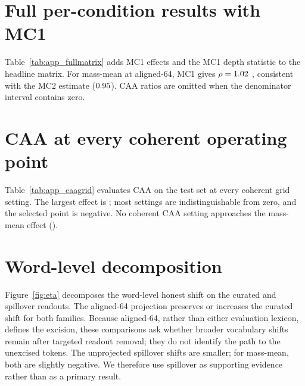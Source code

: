 \section{Full per-condition results with MC1}\label{app:fullmatrix}

Table~\ref{tab:app_fullmatrix} adds MC1 effects and the MC1 depth statistic to the headline matrix. For mass-mean at aligned-64, MC1 gives $\rho = 1.02$ \MmRhoAlSixtyFourMcOneCI{}, consistent with the MC2 estimate ($0.95$). CAA ratios are omitted when the denominator interval contains zero.

\begin{table}[h]
\centering
\small

\caption{Full per-condition results on the \NTest{} held-out test questions, with paired-bootstrap 95\% intervals. $\rho$ (MC1) is reported only where the family's MC1 denominator is bounded away from zero.}
\label{tab:app_fullmatrix}
\end{table}

\section{CAA at every coherent operating point}\label{app:caagrid}

Table~\ref{tab:app_caagrid} evaluates CAA on the test set at every coherent grid setting. The largest effect is \CaaGridMaxDelta{} \CaaGridMaxDeltaCI; most settings are indistinguishable from zero, and the selected point is negative. No coherent CAA setting approaches the mass-mean effect (\MmTestDelta).

\begin{table}[h]
\centering
\small

\caption{CAA test-set $\Delta$MC2 at all coherent grid settings ($^{\star}$ = validation-selected operating point). Paired-bootstrap 95\% intervals.}
\label{tab:app_caagrid}
\end{table}

\section{Word-level decomposition}\label{app:eta}

Figure~\ref{fig:eta} decomposes the word-level honest shift on the curated and spillover readouts. The aligned-64 projection preserves or increases the curated shift for both families. Because aligned-64, rather than either evaluation lexicon, defines the excision, these comparisons ask whether broader vocabulary shifts remain after targeted readout removal; they do not identify the path to the unexcised tokens. The unprojected spillover shifts are smaller; for mass-mean, both are slightly negative. We therefore use spillover as supporting evidence rather than as a primary result.

